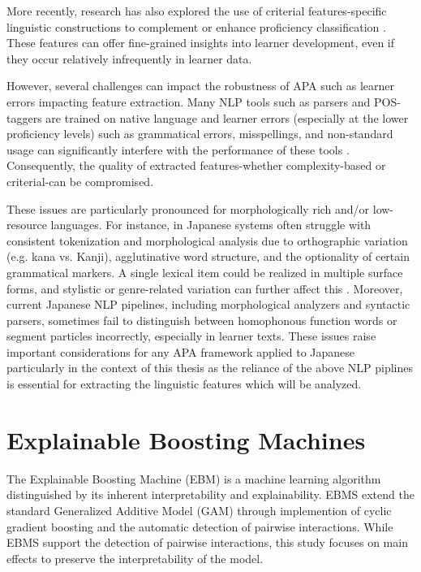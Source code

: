 More recently, research has also explored the use of criterial features-specific linguistic constructions to
complement or enhance proficiency classification
\citep{Hawkins_Buttery_2010,tono2013,tono2018,defino2022, Kim2021}. These features can offer fine-grained insights into
learner development, even if they occur relatively infrequently in learner data.


However, several challenges can impact the robustness of APA such as learner errors impacting feature extraction. Many
NLP tools such as parsers and POS-taggers are trained on native language and learner errors (especially at the
lower proficiency levels)
such as grammatical
errors, misspellings, and non-standard usage can
significantly interfere with the performance of these tools
\citep{Meurers_2015,Meurers2017}.
Consequently, the quality of extracted
features-whether complexity-based or criterial-can be compromised.

These issues are particularly pronounced for morphologically rich and/or low-resource languages. For instance, in
Japanese systems
often
struggle with consistent tokenization and morphological analysis due to orthographic variation (e.g. kana vs.
Kanji), agglutinative word structure, and the optionality of certain grammatical markers. A single lexical item
could be realized in multiple surface forms, and stylistic or genre-related variation can further affect this
\citep{halpern2000challenges,izutsu2021}. Moreover, current Japanese NLP pipelines, including morphological
analyzers and syntactic parsers, sometimes fail to distinguish between homophonous function words or segment
particles incorrectly, especially in learner texts\citep{yang1998,nagata2009}. These issues raise important
considerations for any APA framework applied to Japanese particularly in the context of this thesis as the reliance
of the above NLP piplines is essential for extracting the linguistic features which will be analyzed.


\section{Explainable Boosting Machines}
The Explainable Boosting Machine (EBM)\citet{nori2019} is a machine learning algorithm distinguished by its
inherent
interpretability and explainability. EBMS extend the standard Generalized Additive Model (GAM) through implemention of
cyclic
gradient boosting and the automatic detection of pairwise interactions. While EBMS support the detection of pairwise
interactions, this study focuses on main effects to preserve the interpretability of the model.


